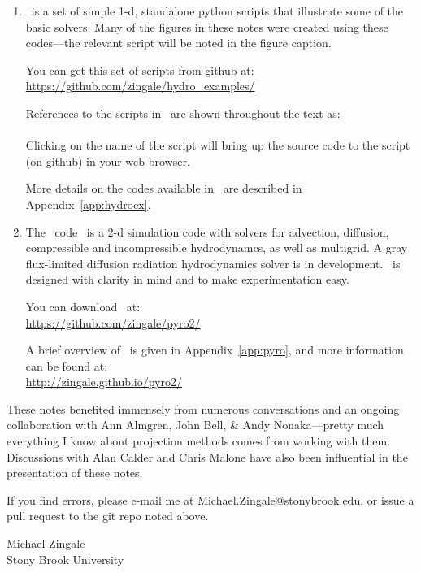 \begin{enumerate}
\item \hydroex\ is a set of simple 1-d, standalone python scripts
  that illustrate some of the basic solvers.  Many of the figures
  in these notes were created using these codes---the relevant
  script will be noted in the figure caption.  

  You can get this set of scripts from github at:\\
  \url{https://github.com/zingale/hydro_examples/}

  References to the scripts in \hydroex\ are shown throughout
  the text as: \\[0.5em]
   \\[0.5em]
  Clicking on the name of the script will bring up the source code
  to the script (on github) in your web browser.

  More details on the codes available in \hydroex\ are described
  in Appendix~\ref{app:hydroex}.

\item  
  The \pyro\ code~\cite{pyro} is a 2-d simulation code with
  solvers for advection, diffusion, compressible and incompressible
  hydrodynamcs, as well as multigrid.  A gray flux-limited diffusion
  radiation hydrodynamics solver is
  in development.  \pyro\ is designed with clarity in mind and to make 
  experimentation easy.  

  You can download \pyro\ at: \\
  \url{https://github.com/zingale/pyro2/} 

  A brief overview of \pyro\ is given in Appendix~\ref{app:pyro},
  and more information can be found at: \\
\url{http://zingale.github.io/pyro2/}
\end{enumerate}

These notes benefited immensely from numerous conversations and an ongoing
collaboration with Ann Almgren, John Bell, \& Andy Nonaka---pretty much
everything I know about projection methods comes from working with them.
Discussions with Alan Calder and Chris Malone have also been influential
in the presentation of these notes.

If you find errors, please e-mail me at Michael.Zingale@stonybrook.edu,
or issue a pull request to the git repo noted above.  



\begin{flushright}
Michael Zingale \\
Stony Brook University
\end{flushright}


